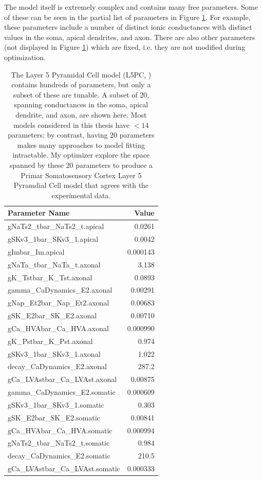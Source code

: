 The model itself is extremely complex and contains many free parameters.
Some of these can be seen in the partial list of parameters in Figure \ref{fig:ca1_parameters}.
For example, these parameters include a number of distinct ionic conductances with distinct values in the soma, apical dendrites, and axon.
There are also other parameters (not displayed in Figure \ref{fig:ca1_parameters}) which are fixed, i.e. they are not modified during optimization.
\begin{center}
\begin{table}
\begin{tabular}{|l|r|}
\toprule
Parameter Name &           Value \\
\midrule
gNaTs2\_tbar\_NaTs2\_t.apical    &    0.0261 \\
gSKv3\_1bar\_SKv3\_1.apical      &    0.0042 \\
gImbar\_Im.apical              &    0.000143 \\
gNaTa\_tbar\_NaTa\_t.axonal      &    3.138 \\
gK\_Tstbar\_K\_Tst.axonal        &    0.0893 \\
gamma\_CaDynamics\_E2.axonal    &    0.00291 \\
gNap\_Et2bar\_Nap\_Et2.axonal    &    0.00683 \\
gSK\_E2bar\_SK\_E2.axonal        &    0.00710 \\
gCa\_HVAbar\_Ca\_HVA.axonal      &    0.000990 \\
gK\_Pstbar\_K\_Pst.axonal        &    0.974 \\
gSKv3\_1bar\_SKv3\_1.axonal      &    1.022 \\
decay\_CaDynamics\_E2.axonal    &  287.2 \\
gCa\_LVAstbar\_Ca\_LVAst.axonal  &    0.00875 \\
gamma\_CaDynamics\_E2.somatic   &    0.000609 \\
gSKv3\_1bar\_SKv3\_1.somatic     &    0.303 \\
gSK\_E2bar\_SK\_E2.somatic       &    0.00841 \\
gCa\_HVAbar\_Ca\_HVA.somatic     &    0.000994 \\
gNaTs2\_tbar\_NaTs2\_t.somatic   &    0.984 \\
decay\_CaDynamics\_E2.somatic   &  210.5 \\
gCa\_LVAstbar\_Ca\_LVAst.somatic &    0.000333 \\
\bottomrule
\end{tabular}

\caption[Subset of model parameters in the conductance-based L5PC neuron]{The Layer 5 Pyramidal Cell model (L5PC, \citep{van2016bluepyopt}
) contains hundreds of parameters, but only a subset of these are tunable.
A subset of 20, spanning conductances in the soma, apical dendrite, and axon, are shown here.
Most models considered in this thesis have $<14$ parameters; by contrast, having 20 parameters makes many approaches to model fitting intractable.
My optimizer explore the space spanned by these 20 parameters to produce a Primar Somatosensory Cortex Layer 5 Pyramdial Cell model that agrees with the experimental data.}
\label{fig:ca1_parameters}
\end{table}
\end{center}

